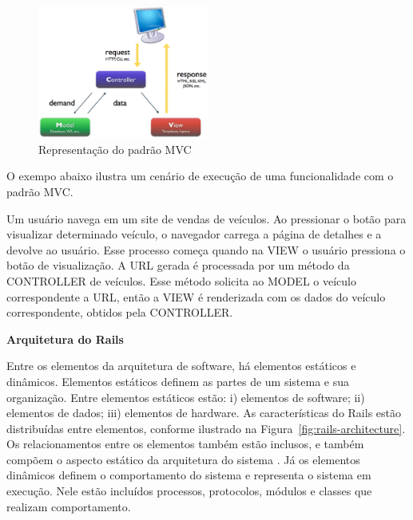 \graphicspath{{figuras/}}
\begin{figure}[H]
\centering
\includegraphics[width=0.5\textwidth]{mvc}
\caption{Representação do padrão MVC}
\label{fig:mvc}
\end{figure}

O exempo abaixo ilustra um cenário de execução de uma funcionalidade com o padrão MVC.

\begin{mdframed}[frametitle={Exemplo},roundcorner=5pt]
Um usuário navega em um site de vendas de veículos. Ao pressionar o botão para visualizar determinado veículo, o navegador carrega a página de detalhes e a devolve ao usuário. Esse processo começa quando na VIEW o usuário pressiona o botão de visualização. A URL gerada é processada por um método da CONTROLLER de veículos. Esse método solicita ao MODEL o veículo correspondente a URL, então a VIEW é renderizada com os dados do veículo correspondente, obtidos pela CONTROLLER.
\end{mdframed}



\textbf{Arquitetura do Rails}

Entre os elementos da arquitetura de software, há elementos estáticos e dinâmicos. Elementos estáticos definem as partes de um sistema e sua organização. Entre elementos estáticos estão: i) elementos de software; ii) elementos de dados; iii) elementos de hardware. 
%
As características do Rails estão distribuídas entre elementos, conforme ilustrado na Figura~\ref{fig:rails-architecture}.
%
Os relacionamentos entre os elementos também estão inclusos, e também compõem o aspecto estático da arquitetura do sistema \cite{germoglio2010fundamentos}.
%
Já os elementos dinâmicos definem o comportamento do sistema e representa o sistema em execução. Nele estão incluídos processos, protocolos, módulos e classes que realizam comportamento.

